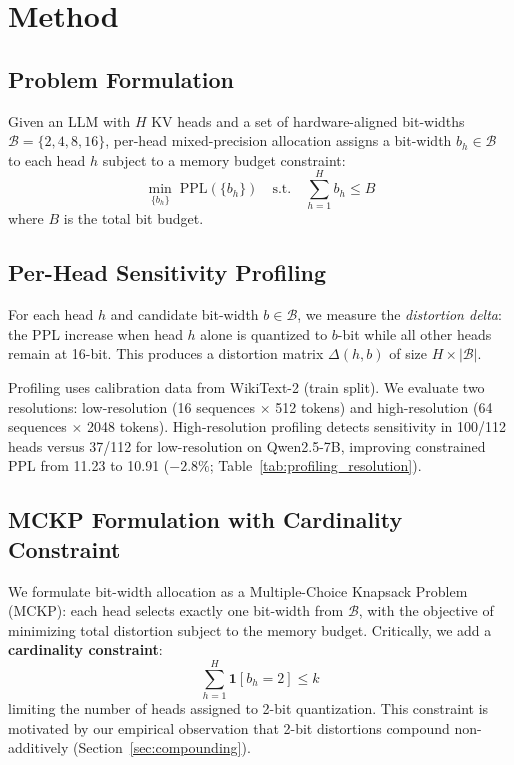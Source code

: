 \documentclass[11pt,a4paper]{article}
\begin{document}
\section{Method}
\label{sec:method}

\subsection{Problem Formulation}

Given an LLM with $H$ KV heads and a set of hardware-aligned bit-widths $\mathcal{B} = \{2, 4, 8, 16\}$, per-head mixed-precision allocation assigns a bit-width $b_h \in \mathcal{B}$ to each head $h$ subject to a memory budget constraint:
\begin{equation}
\min_{\{b_h\}} \; \text{PPL}(\{b_h\}) \quad \text{s.t.} \quad \sum_{h=1}^{H} b_h \le B
\label{eq:allocation}
\end{equation}
where $B$ is the total bit budget.

\subsection{Per-Head Sensitivity Profiling}

For each head $h$ and candidate bit-width $b \in \mathcal{B}$, we measure the \emph{distortion delta}: the PPL increase when head $h$ alone is quantized to $b$-bit while all other heads remain at 16-bit.
This produces a distortion matrix $\Delta(h, b)$ of size $H \times |\mathcal{B}|$.

Profiling uses calibration data from WikiText-2 (train split).
We evaluate two resolutions: low-resolution (16 sequences $\times$ 512 tokens) and high-resolution (64 sequences $\times$ 2048 tokens).
High-resolution profiling detects sensitivity in 100/112 heads versus 37/112 for low-resolution on Qwen2.5-7B, improving constrained PPL from 11.23 to 10.91 ($-2.8\%$; Table~\ref{tab:profiling_resolution}).

\subsection{MCKP Formulation with Cardinality Constraint}

We formulate bit-width allocation as a Multiple-Choice Knapsack Problem (MCKP): each head selects exactly one bit-width from $\mathcal{B}$, with the objective of minimizing total distortion subject to the memory budget.
Critically, we add a \textbf{cardinality constraint}:
\begin{equation}
\sum_{h=1}^{H} \mathbf{1}[b_h = 2] \le k
\label{eq:constraint}
\end{equation}
limiting the number of heads assigned to 2-bit quantization.
This constraint is motivated by our empirical observation that 2-bit distortions compound non-additively (Section~\ref{sec:compounding}).
\end{document}
